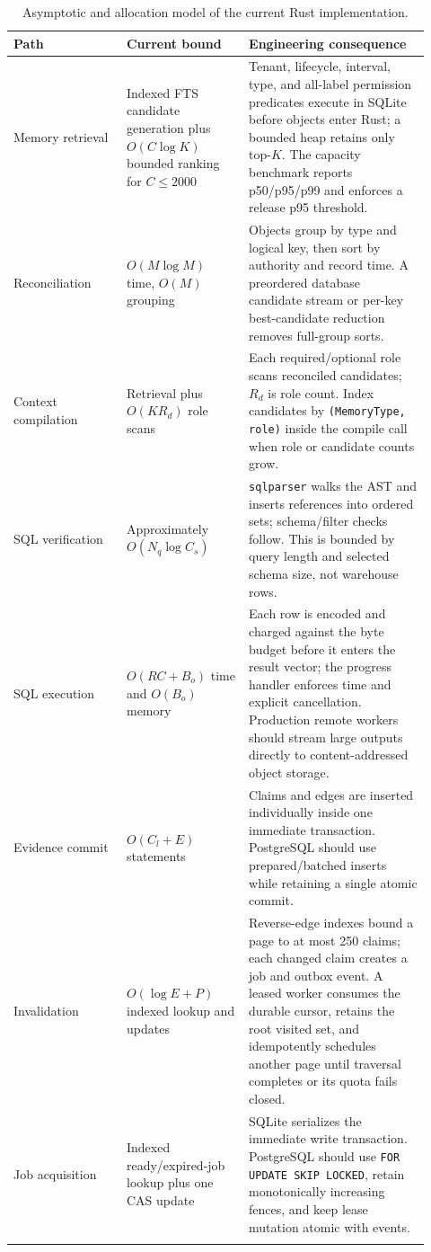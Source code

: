 \documentclass[10pt]{article}
\newcommand{\code}[1]{\texttt{#1}}
\begin{document}
\begin{longtable}{L{0.25\linewidth}L{0.27\linewidth}L{0.40\linewidth}}
\toprule
\textbf{Path} & \textbf{Current bound} & \textbf{Engineering consequence} \\
\midrule
\endhead
Memory retrieval & Indexed FTS candidate generation plus $O(C\log K)$ bounded ranking for $C\leq 2000$ & Tenant, lifecycle, interval, type, and all-label permission predicates execute in SQLite before objects enter Rust; a bounded heap retains only top-$K$. The capacity benchmark reports p50/p95/p99 and enforces a release p95 threshold. \\
Reconciliation & $O(M\log M)$ time, $O(M)$ grouping & Objects group by type and logical key, then sort by authority and record time. A preordered database candidate stream or per-key best-candidate reduction removes full-group sorts. \\
Context compilation & Retrieval plus $O(KR_d)$ role scans & Each required/optional role scans reconciled candidates; $R_d$ is role count. Index candidates by \code{(MemoryType, role)} inside the compile call when role or candidate counts grow. \\
SQL verification & Approximately $O(N_q\log C_s)$ & \code{sqlparser} walks the AST and inserts references into ordered sets; schema/filter checks follow. This is bounded by query length and selected schema size, not warehouse rows. \\
SQL execution & $O(RC + B_o)$ time and $O(B_o)$ memory & Each row is encoded and charged against the byte budget before it enters the result vector; the progress handler enforces time and explicit cancellation. Production remote workers should stream large outputs directly to content-addressed object storage. \\
Evidence commit & $O(C_l + E)$ statements & Claims and edges are inserted individually inside one immediate transaction. PostgreSQL should use prepared/batched inserts while retaining a single atomic commit. \\
Invalidation & $O(\log E + P)$ indexed lookup and updates & Reverse-edge indexes bound a page to at most 250 claims; each changed claim creates a job and outbox event. A leased worker consumes the durable cursor, retains the root visited set, and idempotently schedules another page until traversal completes or its quota fails closed. \\
Job acquisition & Indexed ready/expired-job lookup plus one CAS update & SQLite serializes the immediate write transaction. PostgreSQL should use \code{FOR UPDATE SKIP LOCKED}, retain monotonically increasing fences, and keep lease mutation atomic with events. \\
\bottomrule
\caption{Asymptotic and allocation model of the current Rust implementation.}
\end{longtable}
\end{document}
